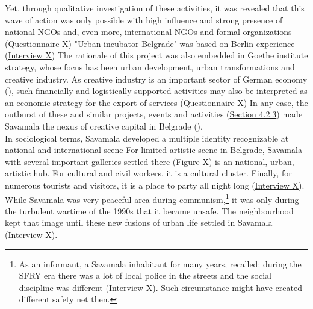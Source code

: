 \documentclass[11pt]{report}
\begin{document}
Yet, through qualitative investigation of these activities, it was revealed that this wave of action was only possible with high influence and strong presence of national NGOs and, even more, international NGOs and formal organizations
(\href{Questionnaire Experts Savamala}{Questionnaire X}) 
"Urban incubator Belgrade" was based on Berlin experience
(\href{InterviewX}{Interview X})
The rationale of this project was also embedded in Goethe institute strategy, whose focus has been urban development, urban transformations and creative industry.
As creative industry is an important sector of German economy 
(\href{Lanz}{\cite{Lanz2012}}),
such financially and logistically supported activities may also be interpreted as an economic strategy for the export of services (\href{Questionnaire Experts Savamala}{Questionnaire X})
In any case, the outburst of these and similar projects, events and activities (\href{Section 4.2.3}{Section 4.2.3}) made Savamala the nexus of creative capital in Belgrade (\href{B92}{\cite{B92 2015}}).
\\

In sociological terms, Savamala developed a multiple identity recognizable at national and international scene
For limited artistic scene in Belgrade, Savamala with several important galleries settled there (\href{Figure X}{Figure X})
is an national, urban, artistic hub.
For cultural and civil workers, it is a cultural cluster.
Finally, for numerous tourists and visitors, it is a place to party all night long (\href{InterviewX}{Interview X}).
\\

While Savamala was very peaceful area during communism,\footnote{As an informant, a Savamala inhabitant for many years, recalled: during the SFRY era there was a lot of local police in the streets and the social discipline was different
(\href{InterviewX}{Interview X}).
Such circumstance might have created different safety net then.}
it was only during the turbulent wartime of the 1990s that it became unsafe.
The neighbourhood kept that image until these new fusions of urban life settled in Savamala (\href{InterviewX}{Interview X}).
\\
\end{document}
